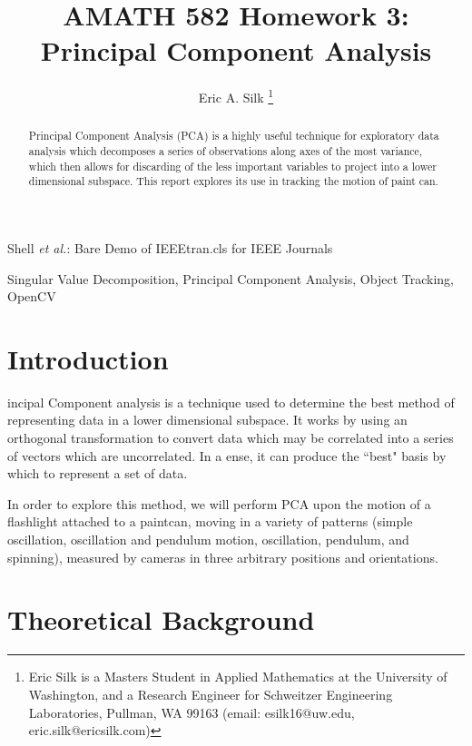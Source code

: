 \documentclass[journal]{IEEEtran}
\begin{document}
\title{AMATH 582 Homework 3: Principal Component Analysis}

\author{Eric A. Silk
\thanks{Eric Silk is a Masters Student in Applied Mathematics at the University of Washington,
		and a Research Engineer for Schweitzer Engineering Laboratories, Pullman, WA 99163 (email: esilk16@uw.edu, eric.silk@ericsilk.com)}
}

{Shell \MakeLowercase{\textit{et al.}}: Bare Demo of IEEEtran.cls for IEEE Journals}
\maketitle

\begin{abstract}
Principal Component Analysis (PCA) is a highly useful technique for exploratory data analysis which decomposes a series of observations along axes of the most variance, which then allows for discarding of the less important variables to project into a lower dimensional subspace. This report explores its use in tracking the motion of paint can.
\end{abstract}

\begin{IEEEkeywords}
Singular Value Decomposition, Principal Component Analysis, Object Tracking, OpenCV
\end{IEEEkeywords}


\IEEEpeerreviewmaketitle


\section{Introduction}
incipal Component analysis is a technique used to determine the best method of
representing data in a lower dimensional subspace. It works by using an orthogonal transformation
to convert data which may be correlated into a series of vectors which are uncorrelated. In a 
ense, it can produce the ``best" basis by which to represent a set of data.

In order to explore this method, we will perform PCA upon the motion of a flashlight attached to a
paintcan, moving in a variety of patterns (simple oscillation, oscillation and pendulum motion,
oscillation, pendulum, and spinning), measured by cameras in three arbitrary positions and 
orientations.

\section{Theoretical Background}
\end{document}
